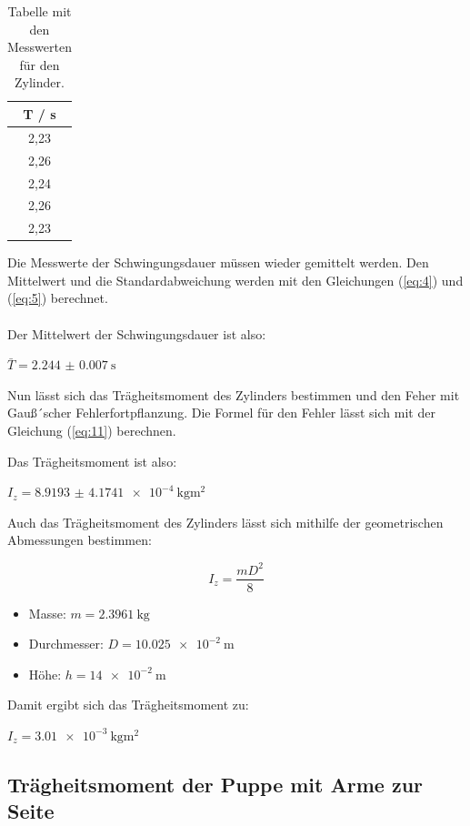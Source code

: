 \begin{table}[H]
  \centering
  \caption{Tabelle mit den Messwerten für den Zylinder.}
  \begin{tabular}{c}
    \toprule
    T / \si{\second} \\
    \midrule
    2,23 \\
    2,26 \\
    2,24 \\
    2,26 \\
    2,23 \\
    \bottomrule
  \end{tabular}
  \label{fig:tab4}
\end{table}

Die Messwerte der Schwingungsdauer müssen wieder gemittelt werden. Den Mittelwert
und die Standardabweichung werden mit den Gleichungen (\ref{eq:4}) und (\ref{eq:5}) berechnet. \\\\

Der Mittelwert der Schwingungsdauer ist also:

\centerline{$\bar{T} = \SI{2.244(7)}{\second}$}

Nun lässt sich das Trägheitsmoment des Zylinders bestimmen und den Feher mit Gauß´scher
Fehlerfortpflanzung. Die Formel für den Fehler lässt sich mit der Gleichung (\ref{eq:11}) berechnen.


Das Trägheitsmoment ist also:

\centerline{$I_z = \SI{8.9193(41741)e-4}{\kilo\gram\meter\squared}$}


Auch das Trägheitsmoment des Zylinders lässt sich mithilfe der geometrischen
Abmessungen bestimmen:

\begin{equation}
  I_z = \frac{mD^2}{8}
  \label{eq:12}
\end{equation}

\begin{itemize}
  \item Masse: $m = \SI{2.3961}{\kilo\gram}$
  \item Durchmesser: $D = \SI{10.025e-2}{\meter}$
  \item Höhe: $h = \SI{14e-2}{\meter}$
\end{itemize}

Damit ergibt sich das Trägheitsmoment zu:

\centerline{$I_z = \SI{3.01e-3}{\kilo\gram\meter\squared}$}

\subsection{Trägheitsmoment der Puppe mit Arme zur Seite}

